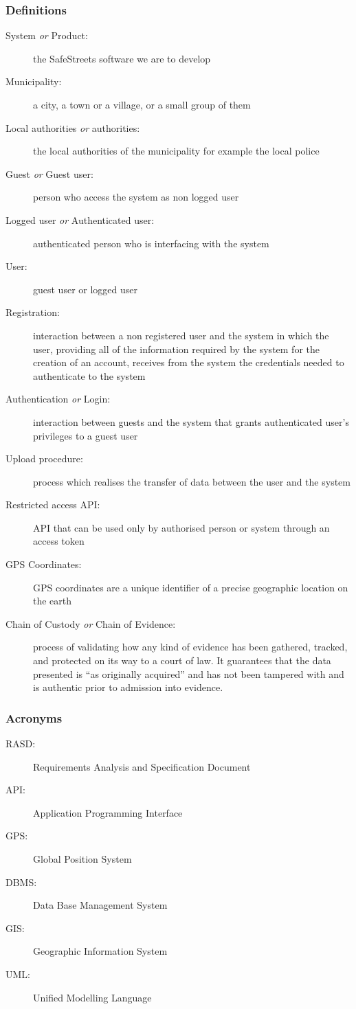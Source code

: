 	\subsubsection{Definitions}
	\begin{description}
		\item[System \emph{or} Product:]the SafeStreets software we are to develop
		\item[Municipality:] a city, a town or a village, or a small group of them
		\item[Local authorities \emph{or} authorities:] the local authorities of the municipality for example the local police
		\item[Guest \emph{or} Guest user:] person who access the system as non logged user
		\item[Logged user \emph{or} Authenticated user:] authenticated person who is interfacing with the system
		\item[User:] guest user or logged user
		\item[Registration:]  interaction between a non registered user and the system in which the user, providing all of the information required by the system for the creation of an account, receives from the system the credentials needed to authenticate to the system
		\item[Authentication \emph{or} Login:] interaction between guests and the system that grants authenticated user's privileges to a guest user
		\item[Upload procedure:] process which realises the transfer of data between the user and the system
		\item[Restricted access API:] API that can be used only by authorised person or system through an access token
		\item[GPS Coordinates:] GPS coordinates are a unique identifier of a precise geographic location on the earth
		\item[Chain of Custody \emph{or} Chain of Evidence:] process of validating how any kind of evidence has been gathered, tracked, and protected on its way to a court of law. It guarantees that the data presented is “as originally acquired” and has not been tampered with and is authentic prior to admission into evidence. \cite{Stone}
		
	\end{description}
\subsubsection{Acronyms}
	\begin{description}
		\item [RASD:] Requirements Analysis and Specification Document
		\item [API:] Application Programming Interface
		\item [GPS:] Global Position System
		\item [DBMS:] Data Base Management System
		\item [GIS:] Geographic Information System
		\item [UML:] Unified Modelling Language
			
	\end{description}
